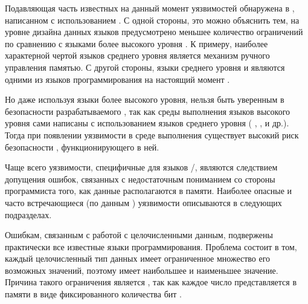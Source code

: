 %
%
Подавляющая часть известных на данный момент уязвимостей обнаружена в , написанном с использованием    . 
%
С одной стороны, это можно объяснить тем, на уровне дизайна данных языков предусмотрено меньшее количество ограничений по сравнению с языками более высокого уровня . 
%
К примеру, наиболее характерной чертой языков среднего уровня является механизм ручного управления памятью. 
%
С другой стороны, языки среднего уровня   и   являются одними из  языков программирования на настоящий момент .

%
Но даже используя языки более высокого уровня, нельзя быть уверенным в безопасности разрабатываемого , так как среды выполнения языков высокого уровня сами написаны с использованием языков среднего уровня ( ,  ,   и др.). 
%
Тогда при появлении уязвимости в среде выполнения существует высокий риск безопасности , функционирующего в ней.

%
Чаще всего уязвимости, специфичные для языков /, являются следствием допущения ошибок, связанных с недостаточным пониманием со стороны программиста того, как данные располагаются в памяти.
%
Наиболее опасные и часто встречающиеся (по данным  ) уязвимости описываются в следующих подразделах. 



%
%
Ошибкам, связанным с работой с целочисленными данным, подвержены практически все известные языки программирования. 
%
Проблема состоит в том, каждый целочисленный тип данных имеет ограниченное множество его возможных значений, поэтому имеет наибольшее и наименьшее значение. 
%
Причина такого ограничения является , так как каждое число представляется в памяти в виде фиксированного количества бит .

